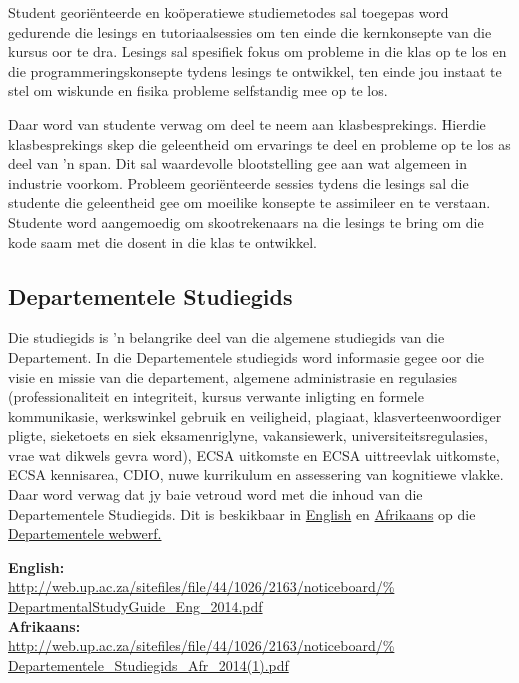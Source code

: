     Student geori\"{e}nteerde en ko\"{o}peratiewe studiemetodes sal
    toegepas word gedurende die lesings en tutoriaalsessies om ten
    einde die kernkonsepte van die kursus oor te dra.  Lesings sal
    spesifiek fokus om probleme in die klas op te los en die
    programmeringskonsepte tydens lesings te ontwikkel, ten einde jou
    instaat te stel om wiskunde en fisika probleme selfstandig mee op
    te los.

    Daar word van studente verwag om deel te neem aan
    klasbesprekings. Hierdie klasbesprekings skep die geleentheid om
    ervarings te deel en probleme op te los as deel van 'n span.  Dit
    sal waardevolle blootstelling gee aan wat algemeen in industrie
    voorkom. Probleem geori\"{e}nteerde sessies tydens die lesings sal
    die studente die geleentheid gee om moeilike konsepte te
    assimileer en te verstaan. Studente word aangemoedig om
    skootrekenaars na die lesings te bring om die kode saam met die
    dosent in die klas te ontwikkel.

    \subsection{Departementele Studiegids}
    Die studiegids is 'n belangrike deel van die algemene studiegids
    van die Departement. In die Departementele studiegids word
    informasie gegee oor die visie en missie van die departement,
    algemene administrasie en regulasies (professionaliteit en
    integriteit, kursus verwante inligting en formele kommunikasie,
    werkswinkel gebruik en veiligheid, plagiaat, klasverteenwoordiger
    pligte, sieketoets en siek eksamenriglyne, vakansiewerk,
    universiteitsregulasies, vrae wat dikwels gevra word), ECSA
    uitkomste en ECSA uittreevlak uitkomste, ECSA kennisarea, CDIO,
    nuwe kurrikulum en assessering van kognitiewe vlakke.  Daar word
    verwag dat jy baie vetroud word met die inhoud van die
    Departementele Studiegids.  Dit is beskikbaar in 
\href{http://web.up.ac.za/sitefiles/file/44/1026/2163/noticeboard/%
        DepartmentalStudyGuide\_Eng\_2014.pdf}{English}
    en
    \href{http://web.up.ac.za/sitefiles/file/44/1026/2163/noticeboard/%
        Departementele\_Studiegids\_Afr\_2014(1).pdf}{Afrikaans}
    op die
    \href{http://web.up.ac.za/default.asp?ipkCategoryID=11426&%
        subid=11426&ipklookid=7}{Departementele webwerf.}

    \noindent
    \textbf{English:} \\
    \url{http://web.up.ac.za/sitefiles/file/44/1026/2163/noticeboard/%
        DepartmentalStudyGuide\_Eng\_2014.pdf} \\
    \textbf{Afrikaans:} \\
    \url{http://web.up.ac.za/sitefiles/file/44/1026/2163/noticeboard/%
        Departementele\_Studiegids\_Afr\_2014(1).pdf} \\~\\


